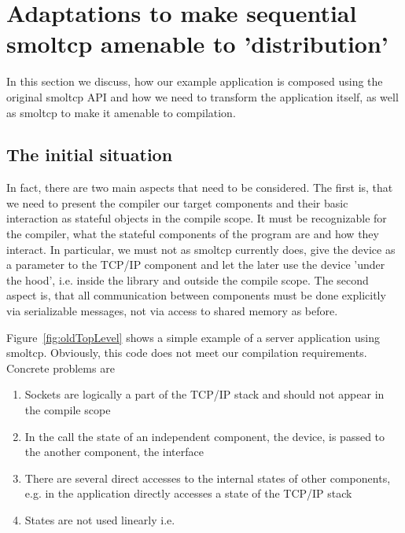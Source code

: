 \section{Adaptations to make sequential smoltcp amenable to 'distribution'}
\label{sec:ImplSmoltcp}

In this section we discuss, how our example application is composed using the original smoltcp API and how we need to transform the application itself, as well as smoltcp to make it amenable to compilation. 


\subsection{The initial situation}
In fact, there are two main aspects that need to be considered. The first is, that we need to present the compiler our target components and their basic interaction as stateful objects in the compile scope. It must be recognizable for the compiler, what the stateful components of the program are and how they interact. In particular, we must not as smoltcp currently does, give the device as a parameter to the TCP/IP component and let the later use the device 'under the hood', i.e. inside the library and outside the compile scope. The second aspect is, that all communication between components must be done explicitly via serializable messages, not via access to shared memory as before.

Figure~\ref{fig:oldTopLevel} shows a simple example of a server application using smoltcp. Obviously, this code does not meet our compilation requirements. Concrete problems are 
\begin{enumerate}
    \item Sockets are logically a part of the TCP/IP stack and should not appear in the compile scope
    \item In the call  the state of an independent component, the device, is passed to the another component, the interface
    \item There are several direct accesses to the internal states of other components, e.g. in  the application directly accesses a state of the TCP/IP stack
    \item States are not used linearly i.e.  
\end{enumerate}


